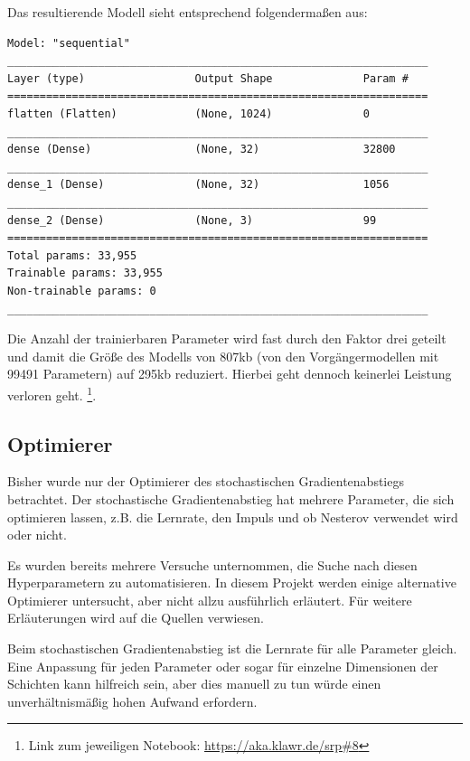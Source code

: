 Das resultierende Modell sieht entsprechend folgendermaßen aus:

\begin{lstlisting}
Model: "sequential"
_________________________________________________________________
Layer (type)                 Output Shape              Param #   
=================================================================
flatten (Flatten)            (None, 1024)              0         
_________________________________________________________________
dense (Dense)                (None, 32)                32800     
_________________________________________________________________
dense_1 (Dense)              (None, 32)                1056      
_________________________________________________________________
dense_2 (Dense)              (None, 3)                 99        
=================================================================
Total params: 33,955
Trainable params: 33,955
Non-trainable params: 0
_________________________________________________________________
\end{lstlisting}

Die Anzahl der trainierbaren Parameter wird fast durch den Faktor drei geteilt und damit die Größe des Modells von 807kb (von den Vorgängermodellen mit 99491 Parametern) auf 295kb reduziert.
Hierbei geht dennoch keinerlei Leistung verloren geht. \footnote{Link zum jeweiligen Notebook: \url{https://aka.klawr.de/srp\#8}}.

\subsection{Optimierer}

Bisher wurde nur der Optimierer des stochastischen Gradientenabstiegs betrachtet.
Der stochastische Gradientenabstieg hat mehrere Parameter, die sich optimieren lassen, z.B. die Lernrate, den Impuls und ob Nesterov verwendet wird oder nicht.

Es wurden bereits mehrere Versuche unternommen, die Suche nach diesen Hyperparametern zu automatisieren.
In diesem Projekt werden einige alternative Optimierer untersucht, aber nicht allzu ausführlich erläutert.
Für weitere Erläuterungen wird auf die Quellen verwiesen.

Beim stochastischen Gradientenabstieg ist die Lernrate für alle Parameter gleich.
Eine Anpassung für jeden Parameter oder sogar für einzelne Dimensionen der Schichten kann hilfreich sein, aber dies manuell zu tun würde einen unverhältnismäßig hohen Aufwand erfordern.

